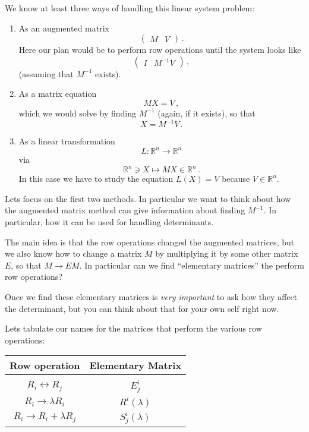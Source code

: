 {We know at least three ways of handling this linear system problem:
\begin{enumerate}
\item As an augmented matrix
\[
\left(
\begin{array}{c|c}
M & V
\end{array}
\right)\, .
\]
Here our plan would be to perform row operations until the system looks like
\[
\left(
\begin{array}{c|c}
I & M^{-1}V
\end{array}
\right)\, ,
\]
(assuming that $M^{-1}$ exists).
\item As a matrix equation
\[
MX=V\, ,
\]
which we would solve by finding $M^{-1}$ (again, if it exists), so that
\[
X=M^{-1}V\, .
\]
\item As a linear transformation
\[L:{\mathbb R}^n\longrightarrow {\mathbb R}^n\]
via
\[
{\mathbb R}^n\ni X \longmapsto MX \in {\mathbb R}^n\, .
\]
In this case we have to study the equation $L(X)=V$ because $V\in {\mathbb R}^n$.
\end{enumerate}
Lets focus on the first two methods. In particular we want to think about how the augmented matrix  method can give information about finding $M^{-1}$. In particular, how it can be used for handling determinants. 

The main idea is that the row operations changed the augmented matrices, but we also know how to change a matrix $M$ by multiplying it by some other matrix $E$, so that $M\to EM$.
In particular can we find ``elementary matrices'' the perform row operations?

Once we find these elementary matrices is {\itshape very important} to  ask how they affect the determinant, but you can think about that for your own self  right now. 

Lets tabulate our names for the matrices that perform the various row operations:
\begin{center}
\begin{tabular}{cc}
Row operation & Elementary Matrix\smallskip\\\hline\\
$R_i\leftrightarrow R_j$ & $E^i_j$\\\smallskip
$R_i\to \lambda R_i$ & $R^i(\lambda)$\\\smallskip
$R_i\to R_i+\lambda R_j$ & $S^i_j(\lambda)$
\end{tabular}
\end{center}

}
